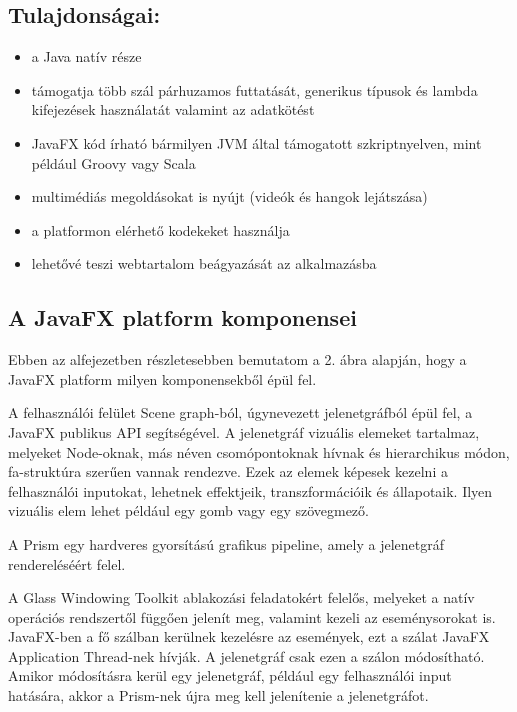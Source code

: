 \subsection*{Tulajdonságai:}
\begin{itemize}
\item a Java natív része 
\item támogatja több szál párhuzamos futtatását, generikus típusok és lambda kifejezések használatát valamint az adatkötést 
\item JavaFX kód írható bármilyen JVM által támogatott szkriptnyelven, mint például Groovy vagy Scala 
\item multimédiás megoldásokat is nyújt (videók és hangok lejátszása) 
\item a platformon elérhető kodekeket használja 
\item lehetővé teszi webtartalom beágyazását az alkalmazásba
\end{itemize}

\subsection*{A JavaFX platform komponensei}

Ebben az alfejezetben részletesebben bemutatom a 2. ábra alapján, hogy a JavaFX platform milyen komponensekből épül fel. 



A felhasználói felület Scene graph-ból, úgynevezett jelenetgráfból épül fel, a JavaFX publikus API segítségével. A jelenetgráf vizuális elemeket tartalmaz, melyeket Node-oknak, más néven csomópontoknak hívnak és hierarchikus módon, fa-struktúra szerűen vannak rendezve. Ezek az elemek képesek kezelni a felhasználói inputokat, lehetnek effektjeik, transzformációik és állapotaik. Ilyen vizuális elem lehet például egy gomb vagy egy szövegmező.  

A Prism egy hardveres gyorsítású grafikus pipeline, amely a jelenetgráf rendereléséért felel. 

A Glass Windowing Toolkit ablakozási feladatokért felelős, melyeket a natív operációs rendszertől függően jelenít meg, valamint kezeli az eseménysorokat is. JavaFX-ben a fő szálban kerülnek kezelésre az események, ezt a szálat JavaFX Application Thread-nek hívják. A jelenetgráf csak ezen a szálon módosítható. Amikor módosításra kerül egy jelenetgráf, például egy felhasználói input hatására, akkor a Prism-nek újra meg kell jelenítenie a jelenetgráfot.  

